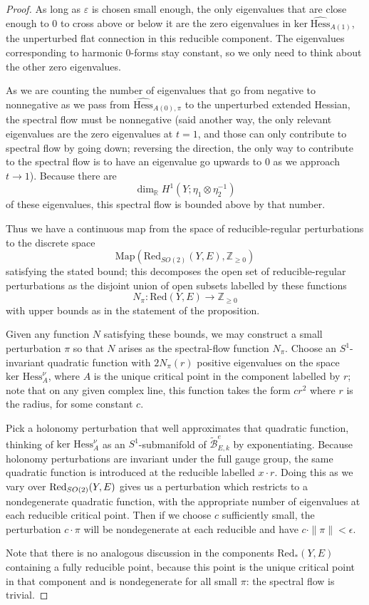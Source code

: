 \documentclass{memo-l}
\theoremstyle{definition}
\theoremstyle{remark}
\numberwithin{section}{chapter}
\numberwithin{equation}{chapter}
\begin{document}
\begin{proof}
As long as $\varepsilon$ is chosen small enough, the only eigenvalues that are close enough to $0$ to cross above or below it are the zero eigenvalues in $\text{ker}\;\widehat{\text{Hess}}_{A(1)}$, the unperturbed flat connection in this reducible component. The eigenvalues corresponding to harmonic $0$-forms stay constant, so we only need to think about the other zero eigenvalues.

As we are counting the number of eigenvalues that go from negative to nonnegative as we pass from $\widehat{\text{Hess}}_{A(0),\pi}$ to the unperturbed extended Hessian, the spectral flow must be nonnegative (said another way, the only relevant eigenvalues are the zero eigenvalues at $t = 1$, and those can only contribute to spectral flow by going down; reversing the direction, the only way to contribute to the spectral flow is to have an eigenvalue go upwards to $0$ as we approach $t \to 1$). Because there are 
$$\dim_{\mathbb R} H^1\left(Y; \eta_1 \otimes \eta_2^{-1}\right)$$ 
of these eigenvalues, this spectral flow is bounded above by that number.

Thus we have a continuous map from the space of reducible-regular perturbations to the discrete space $$\text{Map}(\text{Red}_{SO(2)}(Y,E), \mathbb Z_{\geq 0})$$ 
satisfying the stated bound; this decomposes the open set of reducible-regular perturbations as the disjoint union of open subsets labelled by these functions 
$$N_\pi: \text{Red}(Y, E) \to \mathbb Z_{\geq 0}$$ 
with upper bounds as in the statement of the proposition.

Given any function $N$ satisfying these bounds, we may construct a small perturbation $\pi$ so that $N$ arises as the spectral-flow function $N_\pi$. Choose an $S^1$-invariant quadratic function with $2N_\pi(r)$ positive eigenvalues on the space $\text{ker } \text{Hess}^\nu_A$, where $A$ is the unique critical point in the component labelled by $r$; note that on any given complex line, this function takes the form $cr^2$ where $r$ is the radius, for some constant $c$. 

Pick a holonomy perturbation that well approximates that quadratic function, thinking of $\text{ker } \text{Hess}^\nu_A$ as an $S^1$-submanifold of $\widetilde{\mathcal B}^e_{E,k}$ by exponentiating. Because holonomy perturbations are invariant under the full gauge group, the same quadratic function is introduced at the reducible labelled $x \cdot r$. Doing this as we vary over $\textup{Red}_{SO(2)}(Y,E)$ gives us a perturbation which restricts to a nondegenerate quadratic function, with the appropriate number of eigenvalues at each reducible critical point. Then if we choose $c$ sufficiently small, the perturbation $c \cdot \pi$ will be nondegenerate at each reducible and have $c \cdot \|\pi\| < \epsilon$.

Note that there is no analogous discussion in the components $\text{Red}_*(Y,E)$ containing a fully reducible point, because this point is the unique critical point in that component and is nondegenerate for all small $\pi$: the spectral flow is trivial.
\end{proof}
\end{document}
